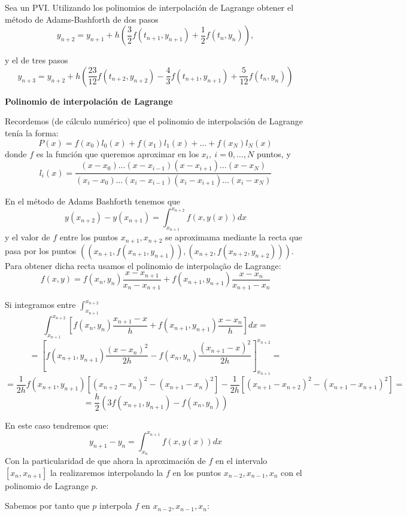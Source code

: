 \begin{problem}[6]
	\ppart Sea un PVI. Utilizando los polinomios de interpolación de Lagrange obtener el método de Adams-Bashforth de dos pasos
	\[y_{n+2} = y_{n+1} + h \left( \frac{3}{2}f(t_{n+1}, y_{n+1}) + \frac{1}{2}f(t_n,y_n) \right),\]

	\ppart y el de tres pasos
	\[y_{n+3} = y_{n+2} + h \left( \frac{23}{12} f(t_{n+2},y_{n+2}) - \frac{4}{3} f(t_{n+1}, y_{n+1}) + \frac{5}{12}f(t_n,y_n) \right)\]

	\solution
	\begin{defn}{\textbf{Polinomio de interpolación de Lagrange}}

		Recordemos (de cálculo numérico) que el polinomio de interpolación de Lagrange tenía la forma:
		\[P(x) = f(x_0)l_0(x) + f(x_1)l_1(x) + … + f(x_N)l_N(x)\]
		donde $f$ es la función que queremos aproximar en los $x_i,\ i=0,…,N$ puntos, y
		\[l_i(x) = \frac{(x-x_0) … (x-x_{i-1}) (x-x_{i+1}) … (x-x_N)}{(x_i-x_0) … (x_i-x_{i-1}) (x_i-x_{i+1}) … (x_i-x_N)}\]
	\end{defn}

	\spart
	En el método de Adams Bashforth tenemos que
	\[y(x_{n+2})-y(x_{n+1}) = \int_{x_{n+1}}^{x_{n+2}} f(x,y(x)) dx\]
	y el valor de $f$ entre los puntos $x_{n+1}, x_{n+2}$ se aproximama mediante la recta que pasa por los puntos $((x_{n+1},f(x_{n+1},y_{n+1})), (x_{n+2}, f(x_{n+2},y_{n+2})))$. Para obtener dicha recta usamos el polinomio de interpolação de Lagrange:
	\[f(x,y) = f(x_n,y_n)\frac{x-x_{n+1}}{x_n-x_{n+1}} + f(x_{n+1},y_{n+1}) \frac{x-x_n}{x_{n+1}-x_n}\]

	Si integramos entre $\int_{x_{n+1}}^{x_{n+2}}$
	\[\int_{x_{n+1}}^{x_{n+2}} \left[ f(x_n,y_n)\frac{x_{n+1}-x}{h} + f(x_{n+1},y_{n+1})\frac{x-x_n}{h} \right]dx =\]
	\[= \left[ f(x_{n+1},y_{n+1}) \frac{(x-x_n)^2}{2h} - f(x_n,y_n)\frac{(x_{n+1}-x)^2}{2h} \right]_{x_{n+1}}^{x_{n+2}}  =\]
	\[= \frac{1}{2h}f(x_{n+1},y_{n+1}) \left[ (x_{n+2}-x_n)^2 - (x_{n+1}-x_n)^2 \right] - \frac{1}{2h} \left[ (x_{n+1} - x_{n+2})^2 - (x_{n+1} - x_{n+1})^2 \right] =\]
	\[= \frac{h}{2} \left( 3f(x_{n+1},y_{n+1}) - f(x_n,y_n) \right)\]


	\spart
	En este caso tendremos que:
	\[y_{n+1} - y_n = \int_{x_n}^{x_{n+1}} f(x,y(x)) dx\]
	Con la particularidad de que ahora la aproximación de $f$ en el intervalo $[x_n,x_{n+1}]$ la realizaremos interpolando la $f$ en los puntos $x_{n-2},x_{n-1},x_n$ con el polinomio de Lagrange $p$.

	Sabemos por tanto que $p$ interpola $f$ en $x_{n-2},x_{n-1},x_n$:


\end{problem}
